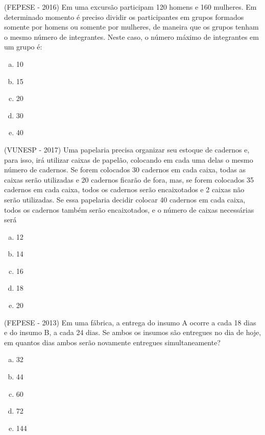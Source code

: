  \begin{exer}
 (FEPESE - 2016) Em uma excursão participam 120 homens e 160 mulheres. Em determinado momento é preciso dividir os participantes em grupos formados somente por homens ou somente por mulheres, de maneira que os grupos tenham o mesmo número de integrantes. Neste caso, o número máximo de integrantes em um grupo é:
  \begin{enumerate}[a)]
  \item 10
  \item 15
  \item 20
  \item 30
  \item 40
  \end{enumerate}
 \end{exer}

 \begin{exer}
 (VUNESP - 2017) Uma papelaria precisa organizar seu estoque de cadernos e, para isso, irá utilizar caixas de papelão, colocando em cada uma delas o mesmo número de cadernos. Se forem colocados 30 cadernos em cada caixa, todas as caixas serão utilizadas e 20 cadernos ficarão de fora, mas, se forem colocados 35 cadernos em cada caixa, todos os cadernos serão encaixotados e 2 caixas não serão utilizadas. Se essa papelaria decidir colocar 40 cadernos em cada caixa, todos os cadernos também serão encaixotados, e o número de caixas necessárias será
  \begin{enumerate}[a)]
  \item 12
  \item 14
  \item 16
  \item 18
  \item 20
  \end{enumerate}
 \end{exer}

 \begin{exer}
 (FEPESE - 2013) Em uma fábrica, a entrega do insumo A ocorre a cada 18 dias e do insumo B, a cada 24 dias. Se ambos os insumos são entregues no dia de hoje, em quantos dias ambos serão novamente entregues simultaneamente?
  \begin{enumerate}[a)]
  \item 32
  \item 44
  \item 60
  \item 72
  \item 144
  \end{enumerate}
 \end{exer}

